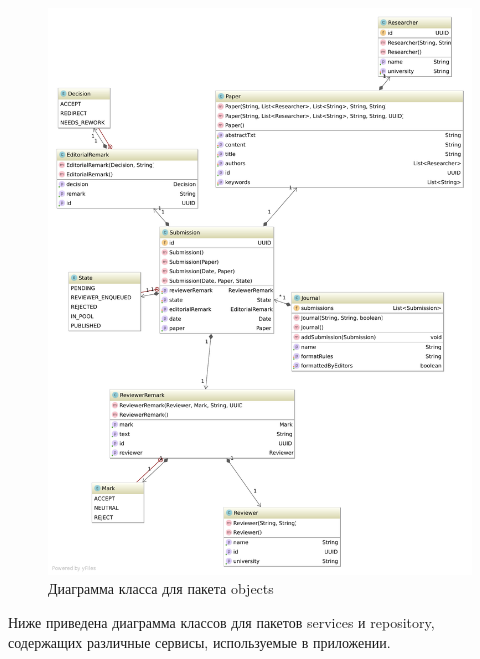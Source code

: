 \begin{figure}[H]
\centering
\includegraphics[width=\textwidth]{diagram.pdf}
\caption{Диаграмма класса для пакета objects}
\end{figure}

Ниже приведена диаграмма классов для пакетов services и repository, содержащих различные сервисы, используемые в приложении.

